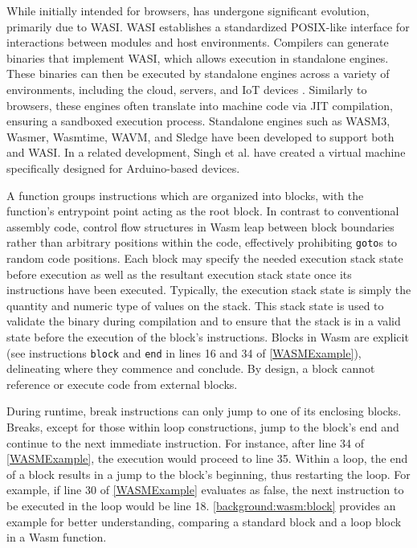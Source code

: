 While initially intended for browsers, \Wasm has undergone significant evolution, primarily due to WASI\cite{WASI}.
WASI establishes a standardized POSIX-like interface for interactions between \Wasm modules and host environments.
Compilers can generate \wasm binaries that implement WASI, which allows execution in standalone engines.
These binaries can then be executed by standalone engines across a variety of environments, including the cloud, servers, and IoT devices \cite{makitalo2021webassembly}.
Similarly to browsers, these engines often translate \Wasm into machine code via JIT compilation, ensuring a sandboxed execution process.
Standalone engines such as WASM3, Wasmer, Wasmtime, WAVM, and Sledge\cite{Sledge} have been developed to support both \Wasm and WASI.
In a related development, Singh et al.\cite{WARDuino2019} have created a \Wasm virtual machine specifically designed for Arduino-based devices.






A \Wasm function groups instructions which are organized into blocks, with the function's entrypoint point acting as the root block. 
In contrast to conventional assembly code, control flow structures in Wasm leap between block boundaries rather than arbitrary positions within the code, effectively prohibiting \texttt{goto}s to random code positions. 
Each block may specify the needed execution stack state before execution as well as the resultant execution stack state once its instructions have been executed.
Typically, the execution stack state is simply the quantity and numeric type of values on the stack. 
This stack state is used to validate the binary during compilation and to ensure that the stack is in a valid state before the execution of the block's instructions.
Blocks in Wasm are explicit (see instructions \texttt{block} and \texttt{end} in lines 16 and 34 of \autoref{WASMExample}), delineating where they commence and conclude.
By design, a block cannot reference or execute code from external blocks.


During runtime, \Wasm break instructions can only jump to one of its enclosing blocks. 
Breaks, except for those within loop constructions, jump to the block's end and continue to the next immediate instruction. 
For instance, after line 34 of \autoref{WASMExample}, the execution would proceed to line 35. 
Within a loop, the end of a block results in a jump to the block's beginning, thus restarting the loop. 
For example, if line 30 of \autoref{WASMExample} evaluates as false, the next instruction to be executed in the loop would be line 18. 
\autoref{background:wasm:block} provides an example for better understanding, comparing a standard block and a loop block in a Wasm function.

